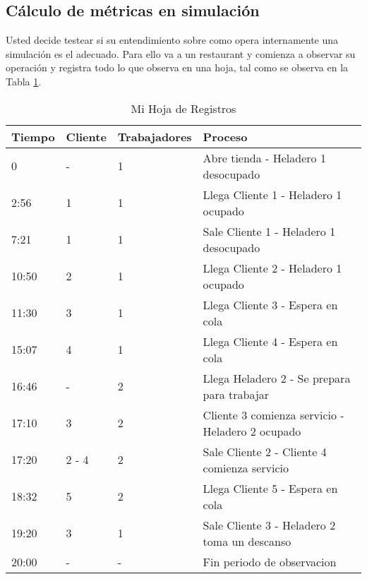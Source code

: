 \documentclass[11pt]{exam}
\begin{document}
\begin{questions}
\section*{C\'alculo de m\'etricas en simulaci\'on}
\question Usted decide testear si su entendimiento sobre como opera internamente una simulaci\'on es el adecuado. Para ello va a un restaurant y comienza a observar su operaci\'on y registra todo lo que observa en una hoja, tal como se observa en la Tabla \ref{tab:1}.
\begin{table}[H] \label{tab:1}
\begin{tabular}{llll}
\hline
\textbf{Tiempo} & \textbf{Cliente} & \textbf{Trabajadores} & \textbf{Proceso}                                                  \\ \hline
0               & -                & 1                     & Abre tienda - Heladero 1 desocupado                               \\
2:56            & 1                & 1                     & Llega Cliente 1 - Heladero 1 ocupado                              \\
7:21            & 1                & 1                     & Sale Cliente 1 - Heladero 1 desocupado                            \\
10:50           & 2                & 1                     & Llega Cliente 2 - Heladero 1 ocupado                              \\
11:30           & 3                & 1                     & Llega Cliente 3 - Espera en cola                                  \\
15:07           & 4                & 1                     & Llega Cliente 4 -  Espera en cola                                 \\
16:46           & -                & 2                     & Llega Heladero 2 - Se prepara para trabajar                                              \\
17:10           & 3                & 2                     & Cliente 3 comienza servicio - Heladero 2 ocupado                  \\
17:20           & 2 - 4            & 2                     & Sale Cliente 2 - Cliente 4 comienza servicio \\
18:32           & 5                & 2                     & Llega Cliente 5 - Espera en cola                                  \\
19:20           & 3                & 1                     & Sale Cliente 3 - Heladero 2 toma un descanso                      \\
20:00           & -                & -                     & Fin periodo de observacion                                        \\ \hline
\end{tabular}
\caption{Mi Hoja de Registros}
\end{table}


\end{questions}
\end{document}
